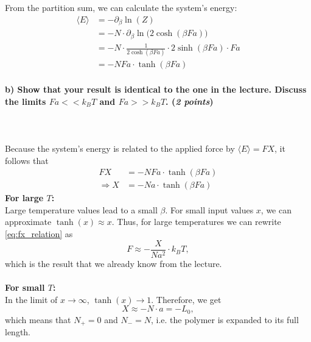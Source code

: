     \noindent
    From the partition sum, we can calculate the system's energy:
    \begin{align}
        \langle E\rangle
        &=-\partial_\beta \ln(Z) \\
        &=-N\cdot\partial_\beta\ln\bigg(2\cosh(\beta Fa)\bigg) \\
        &=-N\cdot\frac{1}{2\cosh(\beta Fa)}\cdot 2\sinh(\beta Fa)\cdot Fa \\
        &=-NFa\cdot\tanh(\beta Fa)
    \end{align}

\newpage
\paragraph{b) Show that your result is identical to the one in the lecture.
    Discuss the limits $Fa<<k_BT$ and $Fa>>k_BT$. (\textit{2 points})
} \ \\
    \\
    Because the system's energy is related to the applied force by 
    $\langle E\rangle=FX$, it follows that 
    \begin{align}
        FX
        &=-NFa\cdot\tanh(\beta Fa) \\
        \Rightarrow X
        &=-Na\cdot\tanh(\beta Fa)
        \label{eq:fx_relation}
    \end{align}
    \textbf{For large $T$:} \\
    Large temperature values lead to a small $\beta$.
    For small input values $x$, we can approximate $\tanh(x)\approx x$.
    Thus, for large temperatures we can rewrite \autoref{eq:fx_relation} as
    \begin{equation}
        F\approx-\frac{X}{Na^2}\cdot k_BT,
    \end{equation}
    which is the result that we already know from the lecture. \\
    \\
    \textbf{For small $T$:} \\
    In the limit of $x\to\infty$, $\tanh(x)\to1$. Therefore, we get 
    \begin{equation}
        X\approx-N\cdot a=-L_0,
    \end{equation}
    which means that $N_+=0$ and $N_-=N$, i.e. the polymer is expanded to its 
    full length.

